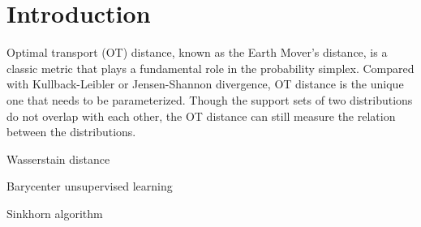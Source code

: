 \section{Introduction}


Optimal transport (OT) distance, known as the
Earth Mover’s distance, is a classic metric that plays a fundamental role in the probability simplex. 
Compared with Kullback-Leibler or Jensen-Shannon divergence, OT
distance is the unique one that needs to be parameterized.
Though the support sets of two distributions do not overlap with each other, the OT distance can still measure the
relation between the distributions. \cite{LiMengXue9157821}

Wasserstain distance

Barycenter
unsupervised learning

Sinkhorn algorithm